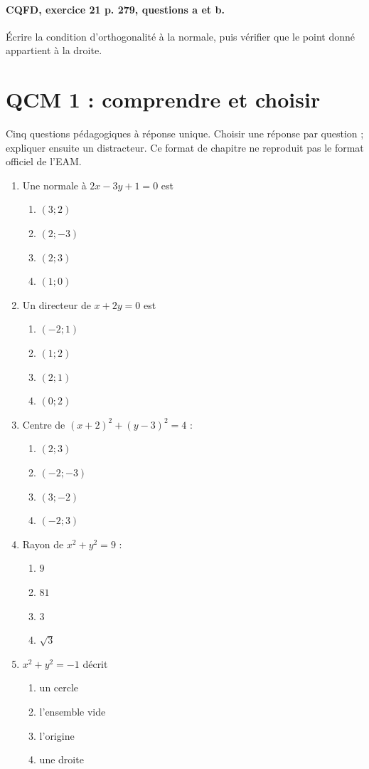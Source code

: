 \paragraph{CQFD, exercice 21 p. 279, questions a et b.}\label{C07-M2} Écrire la condition d’orthogonalité à la normale, puis vérifier que le point donné appartient à la droite.
\begingroup\small
\clearpage\section*{QCM 1 : comprendre et choisir}\label{C07-Q1}
Cinq questions pédagogiques à réponse unique. Choisir une réponse par question ; expliquer ensuite un distracteur. Ce format de chapitre ne reproduit pas le format officiel de l’EAM.
\begin{enumerate}
\item Une normale à $2x-3y+1=0$ est
\begin{enumerate}[label=\Alph*.,itemsep=2pt]
\item $(3;2)$
\item $(2;-3)$
\item $(2;3)$
\item $(1;0)$
\end{enumerate}
\item Un directeur de $x+2y=0$ est
\begin{enumerate}[label=\Alph*.,itemsep=2pt]
\item $(-2;1)$
\item $(1;2)$
\item $(2;1)$
\item $(0;2)$
\end{enumerate}
\item Centre de $(x+2)^2+(y-3)^2=4$ :
\begin{enumerate}[label=\Alph*.,itemsep=2pt]
\item $(2;3)$
\item $(-2;-3)$
\item $(3;-2)$
\item $(-2;3)$
\end{enumerate}
\item Rayon de $x^2+y^2=9$ :
\begin{enumerate}[label=\Alph*.,itemsep=2pt]
\item $9$
\item $81$
\item $3$
\item $\sqrt3$
\end{enumerate}
\item $x^2+y^2=-1$ décrit
\begin{enumerate}[label=\Alph*.,itemsep=2pt]
\item un cercle
\item l’ensemble vide
\item l’origine
\item une droite
\end{enumerate}
\end{enumerate}
